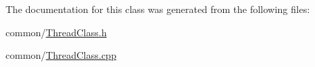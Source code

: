 \-The documentation for this class was generated from the following files\-:\begin{DoxyCompactItemize}
\item 
common/\hyperlink{ThreadClass_8h}{\-Thread\-Class.\-h}\item 
common/\hyperlink{ThreadClass_8cpp}{\-Thread\-Class.\-cpp}\end{DoxyCompactItemize}
